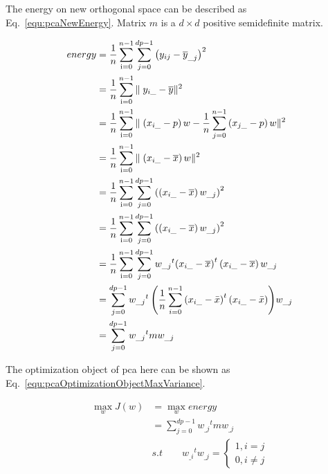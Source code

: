 \documentclass[runningheads,openany]{xhlPaper}
\begin{document}
The energy on new orthogonal space can be described as Eq.~\ref{equ:pcaNewEnergy}. Matrix $m$ is a $d \times d$ positive semidefinite matrix.

\begin{equation}
\label{equ:pcaNewEnergy}
\begin{aligned}
energy &= \frac{1}{n}\sum\limits_{{\rm{i}} = 0}^{n - 1} {\sum\limits_{j = 0}^{dp - 1} {{{\left( {{y_{ij}} - {{\overline y }_{\_j}}} \right)}^2}} } \\
 &= \frac{1}{n}\sum\limits_{{\rm{i}} = 0}^{n - 1} {\parallel {y_{i\_}} - \overline y {\parallel ^2}} \\
 &= \frac{1}{n}\sum\limits_{{\rm{i}} = 0}^{n - 1} {\parallel \left( {{x_{i\_}} - p} \right)w - \frac{1}{n}\sum\limits_{j = 0}^{n - 1} {\left( {{x_{j\_}} - p} \right)w} {\parallel ^2}} \\
 &= \frac{1}{n}\sum\limits_{{\rm{i}} = 0}^{n - 1} {\parallel \left( {{x_{i\_}} - \overline x } \right)w{\parallel ^2}} \\
 &= \frac{1}{n}\sum\limits_{{\rm{i}} = 0}^{n - 1} {\sum\limits_{j = 0}^{{dp} - 1} {{{\left( {\left( {{x_{i\_}} - \overline x } \right){w_{\_j}}} \right)}^2}} } \\
 &= \frac{1}{n}\sum\limits_{{\rm{i}} = 0}^{n - 1} {\sum\limits_{j = 0}^{{dp} - 1} {{{\left( {\left( {{x_{i\_}} - \overline x } \right){w_{\_j}}} \right)}^2}} } \\
 &= \frac{1}{n}\sum\limits_{{\rm{i}} = 0}^{n - 1} {\sum\limits_{j = 0}^{{dp} - 1} {{w_{\_j}}^t{{\left( {{x_{i\_}} - \overline x } \right)}^t}\left( {{x_{i\_}} - \overline x } \right){w_{\_j}}} } \\
 &= \sum\limits_{j = 0}^{{dp} - 1} {{w_{\_j}}^t\left( {\frac{1}{n}\sum\limits_{i = 0}^{n - 1} {{{\left( {{x_{i\_}} - \bar x} \right)}^t}\left( {{x_{i\_}} - \bar x} \right)} } \right)} {w_{\_j}} \\
 &= \sum\limits_{j = 0}^{{dp} - 1} {{w_{\_j}}^t{m}{w_{\_j}}} 
\end{aligned}
\end{equation}

The optimization object of pca here can be shown as Eq.~\ref{equ:pcaOptimizationObjectMaxVariance}.

\begin{equation}
\label{equ:pcaOptimizationObjectMaxVariance}
\begin{aligned}
\mathop {\max }\limits_w J\left( w \right) &= \mathop {\max }\limits_w energy \\
&= \sum\limits_{j = 0}^{{dp} - 1} {{w_{\_j}}^t{m}{w_{\_j}}}\\
&s.t \quad \quad {w_{\_i}}^t{w_{\_j}} = \left\{ {\begin{array}{*{20}{c}}
{1,i = j}\\
{0,i \ne j}
\end{array}} \right.
\end{aligned}
\end{equation}
\end{document}
